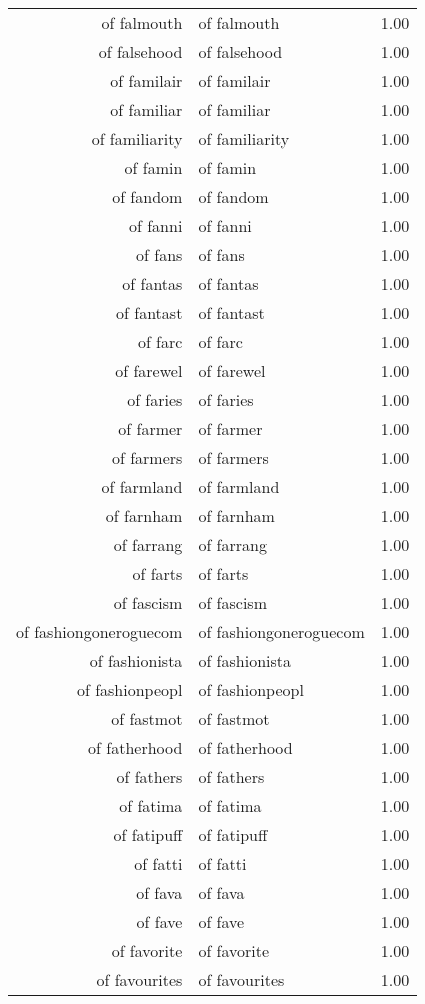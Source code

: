 \begin{table}[ht]
\begin{tabular}{rlr}
  of falmouth & of falmouth & 1.00 \\ 
  of falsehood & of falsehood & 1.00 \\ 
  of familair & of familair & 1.00 \\ 
  of familiar & of familiar & 1.00 \\ 
  of familiarity & of familiarity & 1.00 \\ 
  of famin & of famin & 1.00 \\ 
  of fandom & of fandom & 1.00 \\ 
  of fanni & of fanni & 1.00 \\ 
  of fans & of fans & 1.00 \\ 
  of fantas & of fantas & 1.00 \\ 
  of fantast & of fantast & 1.00 \\ 
  of farc & of farc & 1.00 \\ 
  of farewel & of farewel & 1.00 \\ 
  of faries & of faries & 1.00 \\ 
  of farmer & of farmer & 1.00 \\ 
  of farmers & of farmers & 1.00 \\ 
  of farmland & of farmland & 1.00 \\ 
  of farnham & of farnham & 1.00 \\ 
  of farrang & of farrang & 1.00 \\ 
  of farts & of farts & 1.00 \\ 
  of fascism & of fascism & 1.00 \\ 
  of fashiongoneroguecom & of fashiongoneroguecom & 1.00 \\ 
  of fashionista & of fashionista & 1.00 \\ 
  of fashionpeopl & of fashionpeopl & 1.00 \\ 
  of fastmot & of fastmot & 1.00 \\ 
  of fatherhood & of fatherhood & 1.00 \\ 
  of fathers & of fathers & 1.00 \\ 
  of fatima & of fatima & 1.00 \\ 
  of fatipuff & of fatipuff & 1.00 \\ 
  of fatti & of fatti & 1.00 \\ 
  of fava & of fava & 1.00 \\ 
  of fave & of fave & 1.00 \\ 
  of favorite & of favorite & 1.00 \\ 
  of favourites & of favourites & 1.00 \\ 

\end{tabular}
\end{table}
